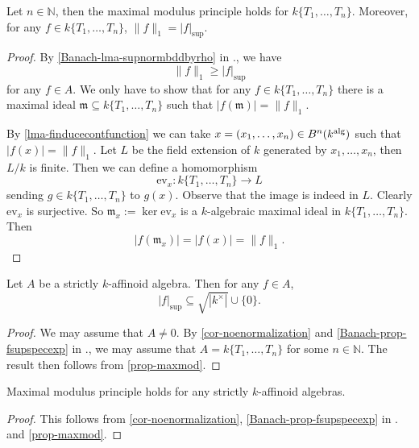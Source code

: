 \begin{proposition}\label{prop-maxmod}
    Let $n\in \mathbb{N}$, then the maximal modulus principle holds for $k\{T_1,\ldots,T_n\}$. Moreover, for any $f\in k\{T_1,\ldots,T_n\}$, $\|f\|_1=|f|_{\sup}$.
\end{proposition}
\begin{proof}
    By \cref{Banach-lma-supnormbddbyrho} in ., we have
    \[
        \|f\|_1\geq |f|_{\sup}
    \]
    for any $f\in A$. We only have to show that for any $f\in k\{T_1,\ldots,T_n\}$ there is a maximal ideal $\mathfrak{m}\subseteq k\{T_1,\ldots,T_n\}$ such that $|f(\mathfrak{m})|=\|f\|_1$.

    By \cref{lma-finducecontfunction} we can take $x=(x_1,\ldots,x_n)\in B^n(k^{\mathrm{alg}})$ such that $|f(x)|=\|f\|_1$. Let $L$ be the field extension of $k$ generated by $x_1,\ldots,x_n$, then $L/k$ is finite. Then we can define a homomorphism
    \[
        \mathrm{ev}_x:  k\{T_1,\ldots,T_n\} \rightarrow L
    \]
    sending $g\in k\{T_1,\ldots,T_n\}$ to $g(x)$. Observe that the image is indeed in $L$. Clearly $\mathrm{ev}_x$ is surjective. So $\mathfrak{m}_x:=\ker \mathrm{ev}_x$ is a $k$-algebraic maximal ideal in $k\{T_1,\ldots,T_n\}$. Then
    \[
        |f(\mathfrak{m}_x)|=|f(x)|=\|f\|_1.  
    \]
\end{proof}


\begin{corollary}\label{cor-strictlyaffsupnorm}
    Let $A$ be a strictly $k$-affinoid algebra. Then for any $f\in A$,
    \[
        |f|_{\sup}\subseteq \sqrt{|k^{\times}|}\cup \{0\}.  
    \]
\end{corollary}
\begin{proof}
    We may assume that $A\neq 0$.
    By \cref{cor-noenormalization} and \cref{Banach-prop-fsupspecexp} in ., we may assume that $A=k\{T_1,\ldots,T_n\}$ for some $n\in \mathbb{N}$. The result then follows from \cref{prop-maxmod}.
\end{proof}


\begin{corollary}\label{cor:maxmodprin}
    Maximal modulus principle holds for any strictly $k$-affinoid algebras.
\end{corollary}
\begin{proof}
    This follows from \cref{cor-noenormalization}, \cref{Banach-prop-fsupspecexp} in . and \cref{prop-maxmod}.
\end{proof}

